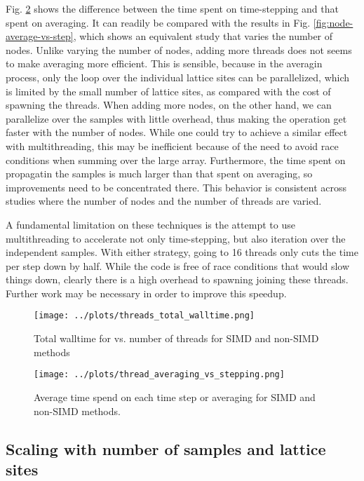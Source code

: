 \documentclass{article}
\begin{document}
Fig. \ref{fig:threads-averaging-vs-stepping} shows the difference between the time spent on time-stepping and 
that spent on averaging. It can readily be compared with the results in Fig. \ref{fig:node-average-vs-step}, which 
shows an equivalent study that varies the number of nodes. Unlike varying the number of nodes, adding more threads 
does not seems to make averaging more efficient. This is sensible, because in the averagin process, only 
the loop over the individual lattice sites can be parallelized, which is limited by the small number of lattice sites, 
as compared with the cost of spawning the threads. When adding more nodes, on the other hand, we can parallelize over
the samples with little overhead, thus making the operation get faster with the number of nodes. While one could 
try to achieve a similar effect with multithreading, this may be inefficient because of the need to avoid race 
conditions when summing over the large array. Furthermore, the time spent on propagatin the samples is much larger
than that spent on averaging, so improvements need to be concentrated there. This behavior is consistent across
studies where the number of nodes and the number of threads are varied.

A fundamental limitation on these techniques is the attempt to use multithreading to accelerate not only time-stepping,
but also iteration over the independent samples. With either strategy, going to 16 threads only cuts the time per step 
down by half. While the code is free of race conditions that would slow things down, clearly there is a high overhead 
to spawning joining these threads. Further work may be necessary in order to improve this speedup.


\begin{figure}
    \centering
    \texttt{[image: ../plots/threads\_total\_walltime.png]}
    \caption{Total walltime for vs. number of threads for SIMD and non-SIMD methods}
    \label{fig:threads-total-walltime}
\end{figure}

\begin{figure}
    \centering
    \texttt{[image: ../plots/thread\_averaging\_vs\_stepping.png]}
    \caption{Average time spend on each time step or averaging for SIMD and non-SIMD methods.}
    \label{fig:threads-averaging-vs-stepping}
\end{figure}

\subsection{Scaling with number of samples and lattice sites}
\end{document}
